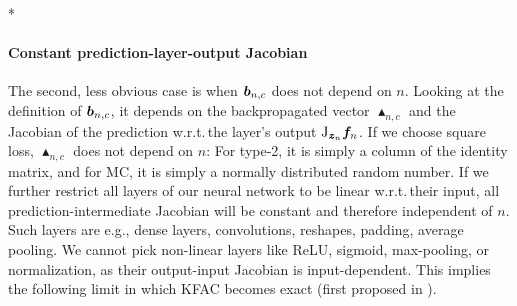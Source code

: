 \switchcolumn[1]*
\switchcolumn[0]

\paragraph{Constant prediction-layer-output Jacobian} The second, less obvious case is when ${\bm{b}}_{n,c}$ does not depend on $n$.
Looking at the definition of ${\bm{b}}_{n,c}$, it depends on the backpropagated vector $\blacktriangle_{n,c}$ and the Jacobian of the prediction w.r.t.\,the layer's output $\mathrm{J}_{{\bm{z}}_n} {\bm{f}}_n$.
If we choose square loss, $\blacktriangle_{n,c}$ does not depend on $n$: For type-2, it is simply a column of the identity matrix, and for MC, it is simply a normally distributed random number.
If we further restrict all layers of our neural network to be linear w.r.t.\,their input, all prediction-intermediate Jacobian will be constant and therefore independent of $n$.
Such layers are e.g., dense layers, convolutions, reshapes, padding, average pooling.
We cannot pick non-linear layers like ReLU, sigmoid, max-pooling, or normalization, as their output-input Jacobian is input-dependent. This implies the following limit in which KFAC becomes exact (first proposed in \cite{bernacchia2018exact}).

